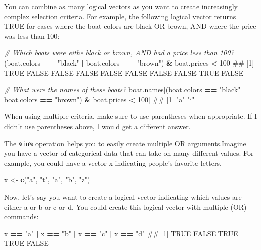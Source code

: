 \documentclass[]{book}
\newenvironment{Shaded}{\begin{snugshade}}{\end{snugshade}}
\newcommand{\KeywordTok}[1]{\textcolor[rgb]{0.13,0.29,0.53}{\textbf{#1}}}
\newcommand{\DecValTok}[1]{\textcolor[rgb]{0.00,0.00,0.81}{#1}}
\newcommand{\StringTok}[1]{\textcolor[rgb]{0.31,0.60,0.02}{#1}}
\newcommand{\CommentTok}[1]{\textcolor[rgb]{0.56,0.35,0.01}{\textit{#1}}}
\newcommand{\OperatorTok}[1]{\textcolor[rgb]{0.81,0.36,0.00}{\textbf{#1}}}
\newcommand{\NormalTok}[1]{#1}
\theoremstyle{definition}
\theoremstyle{definition}
\theoremstyle{remark}
\begin{document}
You can combine as many logical vectors as you want to create
increasingly complex selection criteria. For example, the following
logical vector returns TRUE for cases where the boat colors are black OR
brown, AND where the price was less than 100:

\begin{Shaded}
\begin{Highlighting}[]
\CommentTok{# Which boats were eithe black or brown, AND had a price less than 100?}
\NormalTok{(boat.colors }\OperatorTok{==}\StringTok{ "black"} \OperatorTok{|}\StringTok{ }\NormalTok{boat.colors }\OperatorTok{==}\StringTok{ "brown"}\NormalTok{) }\OperatorTok{&}\StringTok{ }\NormalTok{boat.prices }\OperatorTok{<}\StringTok{ }\DecValTok{100}
\NormalTok{##  [1]  TRUE FALSE FALSE FALSE FALSE FALSE FALSE FALSE  TRUE FALSE}

\CommentTok{# What were the names of these boats?}
\NormalTok{boat.names[(boat.colors }\OperatorTok{==}\StringTok{ "black"} \OperatorTok{|}\StringTok{ }\NormalTok{boat.colors }\OperatorTok{==}\StringTok{ "brown"}\NormalTok{) }\OperatorTok{&}\StringTok{ }\NormalTok{boat.prices }\OperatorTok{<}\StringTok{ }\DecValTok{100}\NormalTok{]}
\NormalTok{## [1] "a" "i"}
\end{Highlighting}
\end{Shaded}

When using multiple criteria, make sure to use parentheses when
appropriate. If I didn't use parentheses above, I would get a different
answer.

The \texttt{\%in\%} operation helps you to easily create multiple OR
arguments.Imagine you have a vector of categorical data that can take on
many different values. For example, you could have a vector x indicating
people's favorite letters.

\begin{Shaded}
\begin{Highlighting}[]
\NormalTok{x <-}\StringTok{ }\KeywordTok{c}\NormalTok{(}\StringTok{"a"}\NormalTok{, }\StringTok{"t"}\NormalTok{, }\StringTok{"a"}\NormalTok{, }\StringTok{"b"}\NormalTok{, }\StringTok{"z"}\NormalTok{)}
\end{Highlighting}
\end{Shaded}

Now, let's say you want to create a logical vector indicating which
values are either a or b or c or d. You could create this logical vector
with multiple \textbar{} (OR) commands:

\begin{Shaded}
\begin{Highlighting}[]
\NormalTok{x }\OperatorTok{==}\StringTok{ "a"} \OperatorTok{|}\StringTok{ }\NormalTok{x }\OperatorTok{==}\StringTok{ "b"} \OperatorTok{|}\StringTok{ }\NormalTok{x }\OperatorTok{==}\StringTok{ "c"} \OperatorTok{|}\StringTok{ }\NormalTok{x }\OperatorTok{==}\StringTok{ "d"}
\NormalTok{## [1]  TRUE FALSE  TRUE  TRUE FALSE}
\end{Highlighting}
\end{Shaded}
\end{document}
